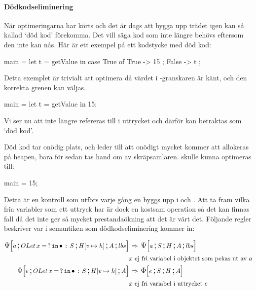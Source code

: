 \documentclass[../Optimise]{subfiles}
\begin{document}
\paragraph{Dödkodseliminering}

\label{sec:DeadCode}

När optimeringarna har körts och det är dags att bygga upp trädet igen kan
så kallad `död kod' förekomma. Det vill säga kod som inte längre 
behövs eftersom den inte kan nås. Här är ett exempel på ett kodstycke med
död kod:

\begin{codeEx}
main = let t = getValue 
       in case True of
              { True  -> 15
              ; False -> t
              };
\end{codeEx}

Detta exemplet är trivialt att optimera då värdet i -granskaren är känt, och 
den korrekta grenen kan väljas.

\begin{codeEx}
main = let t = getValue in 15;
\end{codeEx}


Vi ser nu att  inte längre refereras till i uttrycket  
och därför kan  betraktas som `död kod'. 

Död kod tar onödig plats, och leder till att onödigt mycket kommer att 
allokeras på heapen, bara för sedan tas hand om av skräpsamlaren.  skulle
kunna optimeras till:

\begin{codeEx}
main = 15;
\end{codeEx}

\begin{comment}
Denna process kan mer formellt skrivas som:

\begin{mathpar}
\inferrule
  {t\,\text{ej fri variabel i}\,e_2}
  {\mathtt{let}\,t\,=\,e_1\,\mathtt{in}\,e_2 \Rightarrow e_2}
\;
\end{mathpar}
\end{comment}

Detta är en kontroll som utförs varje gång en  byggs upp 
i \iIrr  och \iPsi. Att ta fram vilka fria variabler som ett uttryck har är dock en 
kostsam operation så det kan finnas fall då det inte ger så mycket
prestandaökning att det är värt det. Följande regler beskriver
var i semantiken som dödkodseliminering kommer in:

\begin{align*}
\CBNPSI{\cOLet xS}{\heap vh}A{lbs}a & \rulesep \CBNPSI SHA{lbs}a\\
& x \text{ ej fri variabel i objektet som pekas ut av } a \nonumber \\
\CBNIRR{\cOLet xS}{\heap vh}Ae & \rulesep \CBNIRR SHAe\\
& x \text{ ej fri variabel i uttrycket } e \nonumber
\end{align*}
\end{document}
